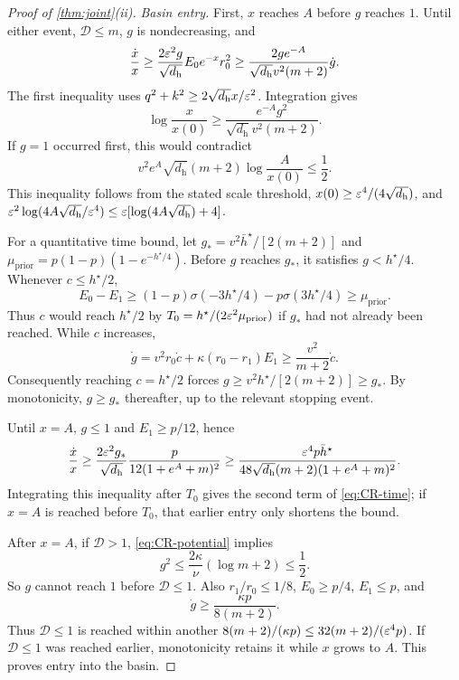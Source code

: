 \begin{proof}[Proof of \cref{thm:joint}(ii)]
\emph{Basin entry.}
First, $x$ reaches $A$ before $g$ reaches $1$. Until either event, $\mathcal D\le m$, $g$ is nondecreasing, and
\[
 \frac{\dot x}{x}\ge\frac{2\varepsilon^2g}{\sqrt{d_{\mathrm h}}}E_0e^{-x}r_0^2
 \ge\frac{2ge^{-A}}{\sqrt{d_{\mathrm h}}v^2(m+2)}\dot g.
\]
The first inequality uses $q^2+k^2\ge2\sqrt{d_{\mathrm h}}x/\varepsilon^2$.
Integration gives
\[
 \log\frac{x}{x(0)}\ge\frac{e^{-A}g^2}{\sqrt{d_{\mathrm h}}v^2(m+2)}.
\]
If $g=1$ occurred first, this would contradict
\[
 v^2e^A\sqrt{d_{\mathrm h}}(m+2)\log\frac{A}{x(0)}\le\frac12.
\]
This inequality follows from the stated scale threshold, $x(0)\ge\varepsilon^4/(4\sqrt{d_{\mathrm h}})$, and
$\varepsilon^2\log(4A\sqrt{d_{\mathrm h}}/\varepsilon^4)\le\varepsilon[\log(4A\sqrt{d_{\mathrm h}})+4]$.

For a quantitative time bound, let $g_*=v^2\bar h^\star/[2(m+2)]$ and
$\mu_{\mathrm{prior}}=p(1-p)(1-e^{-h^\star/4})$.
Before $g$ reaches $g_*$, it satisfies $g<h^\star/4$. Whenever $c\le h^\star/2$,
\[
 E_0-E_1\ge(1-p)\sigma(-3h^\star/4)-p\sigma(3h^\star/4)\ge\mu_{\mathrm{prior}}.
\]
Thus $c$ would reach $h^\star/2$ by $T_0=h^\star/(2\varepsilon^2\mu_{\mathrm{prior}})$ if $g_*$ had not already been reached.
While $c$ increases,
\[
 \dot g=v^2r_0\dot c+\kappa(r_0-r_1)E_1\ge\frac{v^2}{m+2}\dot c.
\]
Consequently reaching $c=h^\star/2$ forces $g\ge v^2h^\star/[2(m+2)]\ge g_*$.
By monotonicity, $g\ge g_*$ thereafter, up to the relevant stopping event.

Until $x=A$, $g\le1$ and $E_1\ge p/12$, hence
\[
 \frac{\dot x}{x}\ge\frac{2\varepsilon^2g_*}{\sqrt{d_{\mathrm h}}}
       \frac{p}{12(1+e^A+m)^2}
 \ge\frac{\varepsilon^4p\bar h^\star}{48\sqrt{d_{\mathrm h}}(m+2)(1+e^A+m)^2}.
\]
Integrating this inequality after $T_0$ gives the second term of \cref{eq:CR-time}; if $x=A$ is reached before $T_0$,
that earlier entry only shortens the bound.

After $x=A$, if $\mathcal D>1$, \eqref{eq:CR-potential} implies
\[
 g^2\le\frac{2\kappa}{\nu}(\log m+2)\le\frac12.
\]
So $g$ cannot reach $1$ before $\mathcal D\le1$. Also $r_1/r_0\le1/8$, $E_0\ge p/4$, $E_1\le p$, and
\[
 \dot g\ge\frac{\kappa p}{8(m+2)}.
\]
Thus $\mathcal D\le1$ is reached within another $8(m+2)/(\kappa p)\le32(m+2)/(\varepsilon^4p)$.
If $\mathcal D\le1$ was reached earlier, monotonicity retains it while $x$ grows to $A$.
This proves entry into the basin.


\end{proof}
